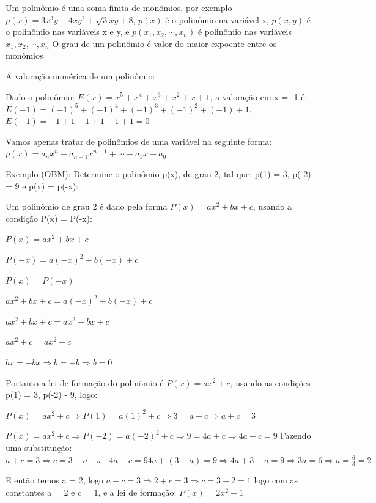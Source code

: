 \begin{multicols*}{2}
\begin{itemize}[wide, labelwidth=!, labelindent=0pt]
    \end{itemize}
    Um polinômio é uma soma finita de monômios, por exemplo
    $p(x) = 3x^3y - 4xy^2 + \sqrt{3}xy + 8$, $p(x)$ é o polinômio na variável x, $p(x,y)$ é o 				polinômio nas variáveis x e y, e $p(x_1, x_2, \cdots, x_n)$ é polinômio nas variáveis $x_1, 			x_2, \cdots, x_n$
    O grau de um polinômio é valor do maior expoente entre os monômios

    A valoração numérica de um polinômio:

    Dado o polinômio: $E(x) = x^5 + x^4 + x^3 + x^2 + x + 1$, a valoração em x = -1 é:
    $E(-1) = (-1)^5 + (-1)^4 + (-1)^3 + (-1)^2 + (-1) + 1$,
    $E(-1) = -1 + 1 - 1 + 1 -1 +1  = 0$

    Vamos apenas tratar de polinômios de uma variável na seguinte forma:
    $p(x) = a_nx^n + a_{n-1}x^{n-1} + \cdots + a_1x + a_0$

    Exemplo (OBM):
    Determine o polinômio p(x), de grau 2, tal que: p(1) = 3, p(-2) = 9 e p(x) = p(-x):

    Um polinômio de grau 2 é dado pela forma $P(x) = ax^2 + bx + c $, usando a condição
    P(x) = P(-x):

    $P(x) = ax^2 + bx + c$

    $P(-x) = a(-x)^2 + b(-x) + c$

    $P(x) = P(-x)$

    $ax^2 + bx + c = a(-x)^2 + b(-x) + c$

    $ax^2 + bx + c = ax^2  - bx + c$

    $ax^2 + c = ax^2 + c$

    $bx = -bx \Rightarrow b = -b \Rightarrow b =0$

    Portanto a lei de formação do polinômio é $P(x) = ax^2 + c$, usando as condições  p(1) = 3, 			p(-2) - 9, logo:

    $P(x) = ax^2 + c \Rightarrow P(1) = a(1)^2 + c \Rightarrow 3 = a + c \Rightarrow a+c = 3$

    $P(x) = ax^2 + c \Rightarrow P(-2) = a(-2)^2 + c \Rightarrow 9 = 4a + c \Rightarrow 4a+c = 9$
    Fazendo uma substituição: $a + c = 3 \Rightarrow c = 3 - a \quad \therefore \quad 4a +c = 9
        4a + (3-a) = 9 \Rightarrow 4a +3 -a = 9 \Rightarrow 3a = 6 \Rightarrow a = \frac{6}{3}  = 2$

    E então temos a = 2, logo $a+c = 3 \Rightarrow 2 + c = 3 \Rightarrow c = 3 - 2 = 1$ logo com as 		constantes a = 2 e c = 1, e a lei de formação: $P(x) = 2x^2 + 1$


\end{multicols*}
